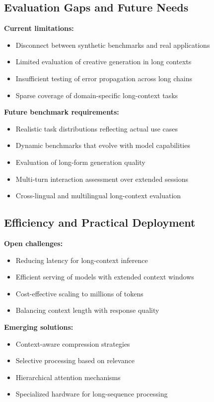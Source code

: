 \documentclass[11pt]{article}
\begin{document}
\subsection{Evaluation Gaps and Future Needs}

\textbf{Current limitations:}
\begin{itemize}[leftmargin=*]
    \item Disconnect between synthetic benchmarks and real applications
    \item Limited evaluation of creative generation in long contexts
    \item Insufficient testing of error propagation across long chains
    \item Sparse coverage of domain-specific long-context tasks
\end{itemize}

\textbf{Future benchmark requirements:}
\begin{itemize}[leftmargin=*]
    \item Realistic task distributions reflecting actual use cases
    \item Dynamic benchmarks that evolve with model capabilities
    \item Evaluation of long-form generation quality
    \item Multi-turn interaction assessment over extended sessions
    \item Cross-lingual and multilingual long-context evaluation
\end{itemize}

\subsection{Efficiency and Practical Deployment}

\textbf{Open challenges:}
\begin{itemize}[leftmargin=*]
    \item Reducing latency for long-context inference
    \item Efficient serving of models with extended context windows
    \item Cost-effective scaling to millions of tokens
    \item Balancing context length with response quality
\end{itemize}

\textbf{Emerging solutions:}
\begin{itemize}[leftmargin=*]
    \item Context-aware compression strategies
    \item Selective processing based on relevance
    \item Hierarchical attention mechanisms
    \item Specialized hardware for long-sequence processing
\end{itemize}
\end{document}
